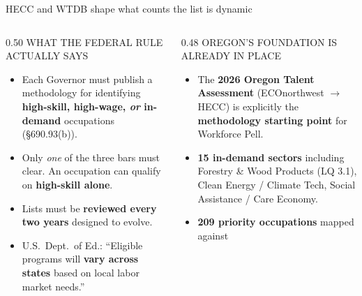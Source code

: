 \documentclass[aspectratio=169,11pt]{beamer}
\newcommand{\eyebrow}[1]{%
  {\sffamily\fontsize{7.5pt}{9pt}\selectfont
   \color{textMuted}%
   \MakeUppercase{#1}%
  }%
}
\newcommand{\theEyebrowText}{}
\newcommand{\frametitleEyebrow}[1]{\renewcommand{\theEyebrowText}{#1}}
\begin{document}
\frametitleEyebrow{Authority / Oregon defines its own in-demand list}
\begin{frame}{HECC and WTDB shape what counts \textemdash{} the list is dynamic}
  \begin{columns}[T,onlytextwidth]
    \begin{column}{0.50\textwidth}
      \rmfamily\fontsize{9.4pt}{12pt}\selectfont
      \color{textPrimary}
      \eyebrow{what the federal rule actually says}
      \vspace{3pt}
      \begin{itemize}\itemsep1pt
        \item Each Governor must publish a methodology for
              identifying \textbf{high-skill, high-wage, \emph{or}
              in-demand} occupations
              {\color{textMuted}(\S 690.93(b))}.
        \item Only \emph{one} of the three bars must clear.
              An occupation can qualify on \textbf{high-skill alone}.
        \item Lists must be \textbf{reviewed every two years}
              \textemdash{} designed to evolve.
        \item U.S.\ Dept.\ of Ed.: ``Eligible programs will
              \textbf{vary across states} based on local labor
              market needs.''
      \end{itemize}
    \end{column}
    \begin{column}{0.48\textwidth}
      \rmfamily\fontsize{9.4pt}{12pt}\selectfont
      \color{textPrimary}
      \eyebrow{Oregon's foundation is already in place}
      \vspace{3pt}
      \begin{itemize}\itemsep1pt
        \item The \textbf{2026 Oregon Talent Assessment}
              (ECOnorthwest \(\rightarrow\) HECC) is explicitly
              the \textbf{methodology starting point} for
              Workforce Pell.
        \item \textbf{15 in-demand sectors} including
              Forestry \& Wood Products
              {\color{textMuted}(LQ 3.1)}, Clean Energy /
              Climate Tech, Social Assistance / Care Economy.
        \item \textbf{209 priority occupations} mapped against

\end{itemize}
\end{column}
\end{columns}
\end{frame}
\end{document}
